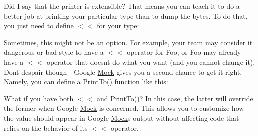 Did I say that the printer is {\ttfamily extensible}? That means you can teach it to do a better job at printing your particular type than to dump the bytes. To do that, you just need to define {\ttfamily $<$$<$} for your type\+:


\begin{DoxyCode}{0}
\DoxyCodeLine{}
\DoxyCodeLine{}
\DoxyCodeLine{}
\DoxyCodeLine{\}}
\DoxyCodeLine{}
\end{DoxyCode}


Sometimes, this might not be an option. For example, your team may consider it dangerous or bad style to have a {\ttfamily $<$$<$} operator for {\ttfamily Foo}, or {\ttfamily Foo} may already have a {\ttfamily $<$$<$} operator that doesn\textquotesingle{}t do what you want (and you cannot change it). Don\textquotesingle{}t despair though -\/ Google \mbox{\hyperlink{class_mock}{Mock}} gives you a second chance to get it right. Namely, you can define a {\ttfamily Print\+To()} function like this\+:


\begin{DoxyCode}{0}
\DoxyCodeLine{}
\DoxyCodeLine{}
\DoxyCodeLine{}
\DoxyCodeLine{\}}
\DoxyCodeLine{}
\end{DoxyCode}


What if you have both {\ttfamily $<$$<$} and {\ttfamily Print\+To()}? In this case, the latter will override the former when Google \mbox{\hyperlink{class_mock}{Mock}} is concerned. This allows you to customize how the value should appear in Google \mbox{\hyperlink{class_mock}{Mock}}\textquotesingle{}s output without affecting code that relies on the behavior of its {\ttfamily $<$$<$} operator.

